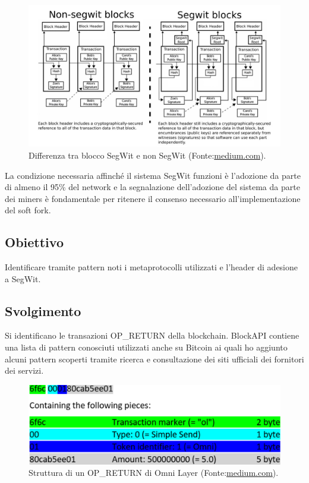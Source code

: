 \begin{figure}[h]
	\centering
	\includegraphics[width=1.0\linewidth]{images/segwitvsnonsegwit-medium}
	\caption{Differenza tra blocco SegWit e non SegWit (Fonte:\url{medium.com}).}
	\label{fig:segwitvsnonsegwit-medium}
\end{figure}


La condizione necessaria affinché il sistema SegWit funzioni è l’adozione da parte di almeno il 95\% del network e la segnalazione dell’adozione del sistema da parte dei miners è fondamentale per ritenere il consenso necessario all’implementazione del soft fork.


\subsection{Obiettivo}
Identificare tramite pattern noti i metaprotocolli utilizzati e l’header di adesione a SegWit.
\subsection{Svolgimento}
Si identificano le transazioni OP\_RETURN della blockchain. BlockAPI contiene una lista di pattern conosciuti utilizzati anche su Bitcoin ai quali ho aggiunto alcuni pattern scoperti tramite ricerca e consultazione dei siti ufficiali dei fornitori dei servizi.

\begin{figure}[h]
	\begin{center}
		\includegraphics[width=1.0\linewidth]{images/ol-omnilayer-medium}
		\caption{Struttura di un OP\_RETURN di Omni Layer (Fonte:\url{medium.com}).}
		\label{fig:ol-omnilayer-medium}
	\end{center}
\end{figure}


